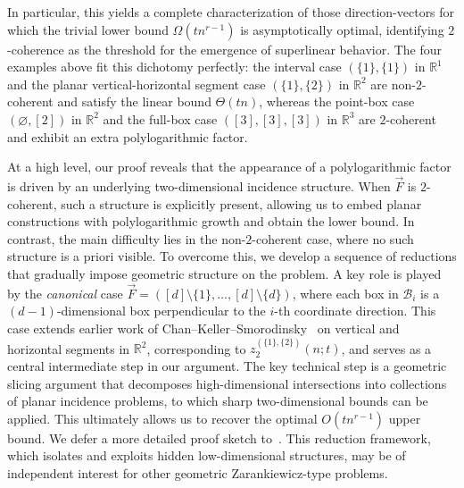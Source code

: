 \documentclass[11pt]{article}
\theoremstyle{definition}
\newcommand*{\R}{\mathbb{R}}                                    %
\newcommand*{\vF}{\vec{F}}
\newcommand*{\cB}{\mathcal{B}}
\begin{document}
In particular, this yields a complete characterization of those direction-vectors for which the trivial lower bound $\Omega(tn^{r-1})$ is asymptotically optimal, identifying $2$-coherence as the threshold for the emergence of superlinear behavior. The four examples above fit this dichotomy perfectly: the interval case $(\{1\}, \{1\})$ in $\R^1$ and the planar vertical-horizontal segment case $(\{1\}, \{2\})$ in $\R^2$ are non-$2$-coherent and satisfy the linear bound $\Theta(tn)$, whereas the point-box case $(\varnothing, [2])$ in $\R^2$ and the full-box case $([3], [3], [3])$ in $\R^3$ are $2$-coherent and exhibit an extra polylogarithmic factor. 


At a high level, our proof reveals that the appearance of a polylogarithmic factor is driven by an underlying two-dimensional incidence structure. When $\vF$ is $2$-coherent, such a structure is explicitly present, allowing us to embed planar constructions with polylogarithmic growth and obtain the lower bound. In contrast, the main difficulty lies in the non-$2$-coherent case, where no such structure is a priori visible. To overcome this, we develop a sequence of reductions that gradually impose geometric structure on the problem. A key role is played by the \emph{canonical} case $\vF = ([d] \setminus \{1\}, \dots, [d] \setminus \{d\})$, where each box in $\cB_i$ is a $(d-1)$-dimensional box perpendicular to the $i$-th coordinate direction. This case extends earlier work of Chan--Keller--Smorodinsky~\cite{keller_smorodinsky,chan_keller_smorodinsky} on vertical and horizontal segments in $\R^2$, corresponding to $z_2^{(\{1\}, \{2\})}(n; t)$, and serves as a central intermediate step in our argument. The key technical step is a geometric slicing argument that decomposes high-dimensional intersections into collections of planar incidence problems, to which sharp two-dimensional bounds can be applied. This ultimately allows us to recover the optimal $O(tn^{r-1})$ upper bound. We defer a more detailed proof sketch to~. This reduction framework, which isolates and exploits hidden low-dimensional structures, may be of independent interest for other geometric Zarankiewicz-type problems.
\end{document}
